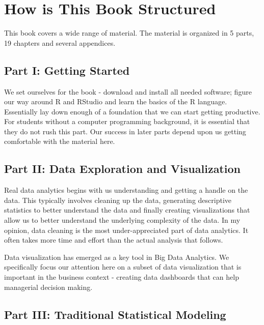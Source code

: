 \documentclass[]{krantz}
\begin{document}
\section*{How is This Book
Structured}\label{how-is-this-book-structured}


This book covers a wide range of material. The material is organized in
5 parts, 19 chapters and several appendices.

\subsection*{Part I: Getting Started}\label{part-i-getting-started}


We set ourselves for the book - download and install all needed
software; figure our way around R and RStudio and learn the basics of
the R language. Essentially lay down enough of a foundation that we can
start getting productive. For students without a computer programming
background, it is essential that they do not rush this part. Our success
in later parts depend upon us getting comfortable with the material
here.

\subsection*{Part II: Data Exploration and
Visualization}\label{part-ii-data-exploration-and-visualization}

Real data analytics begins with us understanding and getting a handle on
the data. This typically involves cleaning up the data, generating
descriptive statistics to better understand the data and finally
creating visualizations that allow us to better understand the
underlying complexity of the data. In my opinion, data cleaning is the
most under-appreciated part of data analytics. It often takes more time
and effort than the actual analysis that follows.

Data visualization has emerged as a key tool in Big Data Analytics. We
specifically focus our attention here on a subset of data visualization
that is important in the business context - creating data dashboards
that can help managerial decision making.

\subsection*{Part III: Traditional Statistical
Modeling}\label{part-iii-traditional-statistical-modeling}
\end{document}
